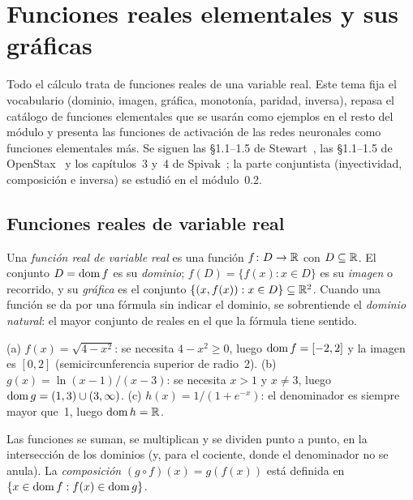 \chapter{Funciones reales elementales y sus gráficas}
\label{tema:1}

Todo el cálculo trata de funciones reales de una variable real. Este tema fija el vocabulario (dominio, imagen, gráfica, monotonía, paridad, inversa), repasa el catálogo de funciones elementales que se usarán como ejemplos en el resto del módulo y presenta las funciones de activación de las redes neuronales como funciones elementales más. Se siguen las §1.1--1.5 de Stewart~\cite{stewart}, las §1.1--1.5 de OpenStax~\cite{osc1} y los capítulos~3 y~4 de Spivak~\cite{spivak}; la parte conjuntista (inyectividad, composición e inversa) se estudió en el módulo~0.2.

\section{Funciones reales de variable real}

\begin{definicion}\label{def:funcion}
Una \emph{función real de variable real} es una función $f\colon D\to\mathbb{R}$ con $D\subseteq\mathbb{R}$. El conjunto $D=\operatorname{dom} f$ es su \emph{dominio}; $f(D)=\{f(x):x\in D\}$ es su \emph{imagen} o recorrido, y su \emph{gráfica} es el conjunto $\{(x,f(x)):x\in D\}\subseteq\mathbb{R}^{2}$. Cuando una función se da por una fórmula sin indicar el dominio, se sobrentiende el \emph{dominio natural}: el mayor conjunto de reales en el que la fórmula tiene sentido.
\end{definicion}

\begin{ejemplo}\label{ej:dominios}
(a) $f(x)=\sqrt{4-x^{2}}$: se necesita $4-x^{2}\ge0$, luego $\operatorname{dom} f=[-2,2]$ y la imagen es $[0,2]$ (semicircunferencia superior de radio~2). (b) $g(x)=\ln(x-1)/(x-3)$: se necesita $x>1$ y $x\ne3$, luego $\operatorname{dom} g=(1,3)\cup(3,\infty)$. (c) $h(x)=1/(1+e^{-x})$: el denominador es siempre mayor que~1, luego $\operatorname{dom} h=\mathbb{R}$.
\end{ejemplo}

Las funciones se suman, se multiplican y se dividen punto a punto, en la intersección de los dominios (y, para el cociente, donde el denominador no se anula). La \emph{composición} $(g\circ f)(x)=g(f(x))$ está definida en $\{x\in\operatorname{dom} f: f(x)\in\operatorname{dom} g\}$.

